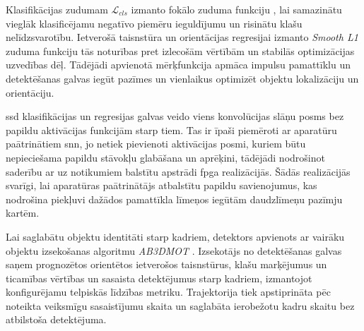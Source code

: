 Klasifikācijas zudumam \(\mathcal{L}_{cls}\) izmanto fokālo zuduma funkciju \cite{lin2017}, lai samazinātu vieglāk klasificējamu negatīvo piemēru ieguldījumu un risinātu klašu nelīdzsvarotību. Ietverošā taisnstūra un orientācijas regresijai izmanto \textit{Smooth L1} zuduma funkciju tās noturības pret izlecošām vērtībām un stabilās optimizācijas uzvedības dēļ. Tādējādi apvienotā mērķfunkcija apmāca impulsu pamattīklu un detektēšanas galvas iegūt pazīmes un vienlaikus optimizēt objektu lokalizāciju un orientāciju.

\Gls{ssd} klasifikācijas un regresijas galvas veido viens konvolūcijas slāņu posms bez papildu aktivācijas funkcijām starp
tiem. Tas ir īpaši piemēroti ar aparatūru paātrinātiem \Gls{snn}, jo netiek pievienoti aktivācijas posmi, kuriem būtu
nepieciešama papildu stāvokļu glabāšana un aprēķini, tādējādi nodrošinot saderību ar uz notikumiem balstītu apstrādi \Gls{fpga}
realizācijās. Šādās realizācijās svarīgi, lai aparatūras paātrinātājs atbalstītu papildu savienojumus, kas nodrošina piekļuvi
dažādos pamattīkla līmeņos iegūtām daudzlīmeņu pazīmju kartēm.

Lai saglabātu objektu identitāti starp kadriem, detektors apvienots ar vairāku objektu izsekošanas algoritmu
\textit{AB3DMOT} \cite{weng2020}. Izsekotājs no detektēšanas galvas saņem prognozētos orientētos ietverošos taisnstūrus,
klašu marķējumus un ticamības vērtības un sasaista detektējumus starp kadriem, izmantojot konfigurējamu telpiskās līdzības
metriku. Trajektorija tiek apstiprināta pēc noteikta veiksmīgu sasaistījumu skaita un saglabāta ierobežotu kadru skaitu bez
atbilstoša detektējuma.


